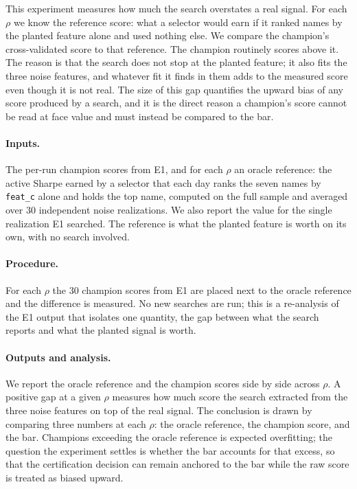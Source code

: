 \documentclass[11pt]{article}
\newcommand{\code}[1]{\texttt{#1}}
\begin{document}
This experiment measures how much the search overstates a real
signal. For each $\rho$ we know the reference score: what a selector would earn if it ranked names by the
planted feature alone and used nothing else. We compare the champion's cross-validated score to that
reference. The champion routinely scores above it. The reason is that the search does not stop at the
planted feature; it also fits the three noise features, and whatever fit it finds in them adds to the
measured score even though it is not real. The size of this gap quantifies the upward bias of any score
produced by a search, and it is the direct reason a champion's score cannot be read at face value and
must instead be compared to the bar.

\paragraph{Inputs.} The per-run champion scores from E1, and for each $\rho$ an oracle reference: the
active Sharpe earned by a selector that each day ranks the seven names by \code{feat\_c} alone and holds
the top name, computed on the full sample and averaged over 30 independent noise realizations. We also
report the value for the single realization E1 searched. The reference
is what the planted feature is worth on its own, with no search involved.

\paragraph{Procedure.} For each $\rho$ the 30 champion scores from E1 are placed next to the oracle
reference and the difference is measured. No new searches are run; this is a re-analysis of the E1 output
that isolates one quantity, the gap between what the search reports and what the planted signal is worth.

\paragraph{Outputs and analysis.} We report the oracle reference and the champion scores side by side
across $\rho$. A positive gap at a given $\rho$ measures how much score the search extracted from the
three noise features on top of the real signal. The conclusion is drawn by comparing three numbers at
each $\rho$: the oracle reference, the champion score, and the bar. Champions exceeding the oracle
reference is expected overfitting; the question the experiment settles is whether the bar accounts for
that excess, so that the certification decision can remain anchored to the bar while the raw score is
treated as biased upward.
\end{document}
